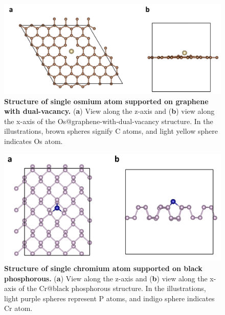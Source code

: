 \begin{figure}[htbp]
  \centering
  \includegraphics[width=\textwidth]{supp_fig4_Os-gra-vac.png}
  \caption{\textbf{Structure of single osmium atom supported on graphene with dual-vacancy.}
  (\textbf{a}) View along the z-axis and (\textbf{b}) view along the x-axis
  of the Os@graphene-with-dual-vacancy structure.
  In the illustrations, brown spheres signify C atoms, and light yellow sphere
  indicates Os atom.}
  \label{supp_fig4:Os-gra-vac}
\end{figure}

\begin{figure}[htbp]
  \centering
  \includegraphics[width=\textwidth]{supp_fig5_Cr-BP.png}
  \caption{\textbf{Structure of single chromium atom supported on black phosphorous.}
  (\textbf{a}) View along the z-axis and (\textbf{b}) view along the x-axis
  of the Cr@black phosphorous structure.
  In the illustrations, light purple spheres represent P atoms, and indigo sphere
  indicates Cr atom.}
  \label{supp_fig5:Cr-BP}
\end{figure}

